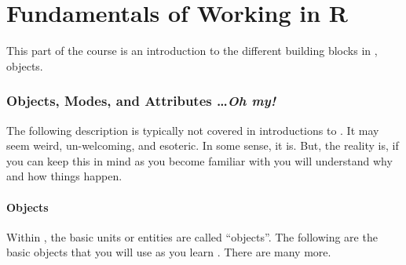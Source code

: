 \part{Fundamentals of Working in R}

This part of the course is an introduction to the different building
blocks in \R{}, objects.

\section{Objects, Modes, and Attributes \ldots \textit{Oh my!}}

The following description is typically not covered in introductions to
\R{}. It may seem weird, un-welcoming, and esoteric. In some sense, it
is. But, the reality is, if you can keep this in mind as you become
familiar with \R{} you will understand why and how things happen.

\subsection{Objects}

Within \R{}, the basic units or entities are called ``objects''. The
following are the basic objects that you will use as you learn
\R{}. There are many more.

